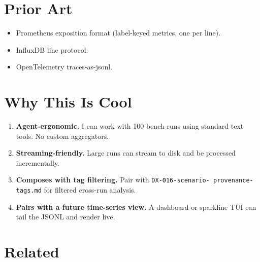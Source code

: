 \section{Prior Art}\label{record-324-prior-art}

\begin{itemize}
\tightlist
\item
  Prometheus exposition format (label-keyed metrics, one per line).
\item
  InfluxDB line protocol.
\item
  OpenTelemetry traces-as-jsonl.
\end{itemize}

\section{Why This Is Cool}\label{record-324-why-this-is-cool}

\begin{enumerate}
\def\labelenumi{\arabic{enumi}.}
\tightlist
\item
  \textbf{Agent-ergonomic.} I can work with 100 bench runs using standard text tools. No custom aggregators.
\item
  \textbf{Streaming-friendly.} Large runs can stream to disk and be processed incrementally.
\item
  \textbf{Composes with tag filtering.} Pair with \texttt{D\allowbreak{}X\allowbreak{}-\allowbreak{}0\allowbreak{}1\allowbreak{}6\allowbreak{}-\allowbreak{}s\allowbreak{}c\allowbreak{}e\allowbreak{}n\allowbreak{}a\allowbreak{}r\allowbreak{}i\allowbreak{}o\allowbreak{}-\allowbreak{} \allowbreak{}p\allowbreak{}r\allowbreak{}o\allowbreak{}v\allowbreak{}e\allowbreak{}n\allowbreak{}a\allowbreak{}n\allowbreak{}c\allowbreak{}e\allowbreak{}-\allowbreak{}t\allowbreak{}a\allowbreak{}g\allowbreak{}s\allowbreak{}.\allowbreak{}m\allowbreak{}d} for filtered cross-run analysis.
\item
  \textbf{Pairs with a future time-series view.} A dashboard or sparkline TUI can tail the JSONL and render live.
\end{enumerate}

\section{Related}\label{record-324-related}

